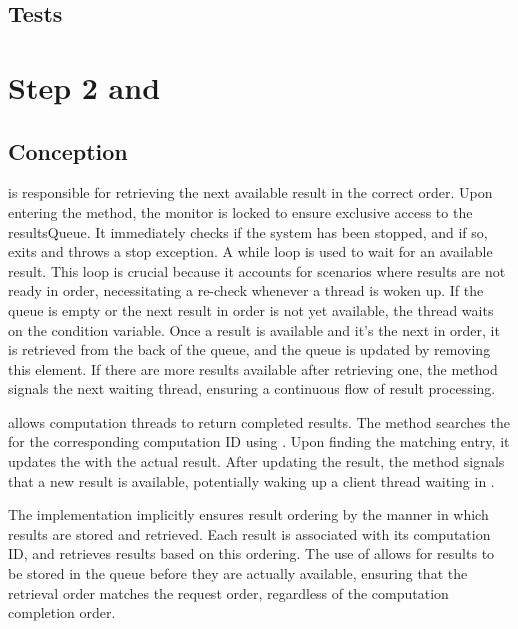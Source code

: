 \documentclass{article}
\begin{document}
    \subsection{Tests}

    \section{Step 2  and }
    \subsection{Conception}

     is responsible for retrieving the next available result in the correct order. Upon entering the method, the monitor is locked to ensure exclusive access to the resultsQueue. It immediately checks if the system has been stopped, and if so, exits and throws a stop exception. A while loop is used to wait for an available result. This loop is crucial because it accounts for scenarios where results are not ready in order, necessitating a re-check whenever a thread is woken up. If the queue is empty or the next result in order is not yet available, the thread waits on the  condition variable. Once a result is available and it's the next in order, it is retrieved from the back of the queue, and the queue is updated by removing this element. If there are more results available after retrieving one, the method signals the next waiting thread, ensuring a continuous flow of result processing.

     allows computation threads to return completed results. The method searches the  for the corresponding computation ID using . Upon finding the matching entry, it updates the  with the actual result. After updating the result, the method signals that a new result is available, potentially waking up a client thread waiting in .

    The implementation implicitly ensures result ordering by the manner in which results are stored and retrieved. Each result is associated with its computation ID, and  retrieves results based on this ordering. The use of  allows for results to be stored in the queue before they are actually available, ensuring that the retrieval order matches the request order, regardless of the computation completion order.
\end{document}
